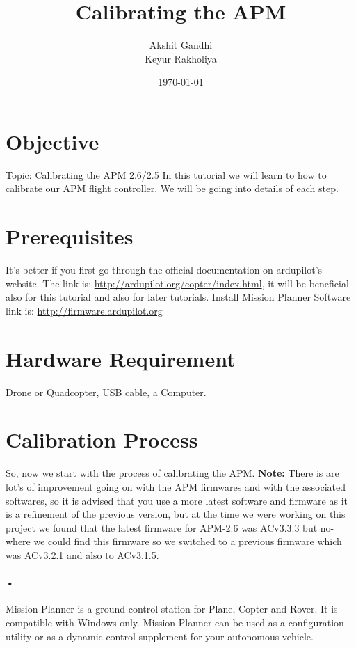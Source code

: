 \documentclass[11pt,a4paper]{article}
\title{Calibrating the APM}
\author{Akshit Gandhi \\ Keyur Rakholiya}
\date{\today}
\begin{document}
	\maketitle
	\newpage
	\tableofcontents
	\newpage
	\section{Objective}
	Topic: Calibrating the APM 2.6/2.5
		In this tutorial we will learn to how to calibrate our APM flight controller. We will be going into details of each step.
	\section{Prerequisites}
	 It's better if you first go through the official documentation on ardupilot's website. The link is: \url{http://ardupilot.org/copter/index.html}, it will be beneficial also for this tutorial and also for later tutorials. Install Mission Planner Software link is: \url{http://firmware.ardupilot.org}
	\section{Hardware Requirement}
	 Drone or Quadcopter, USB cable, a Computer.
	\section{Calibration Process}
	 So, now we start with the process of calibrating the APM. \textbf{Note:} There is are lot's of improvement going on with the APM firmwares and with the associated softwares, so it is advised that you use a more latest software and firmware as it is a refinement of the previous version, but at the time we were working on this project we found that the latest firmware for APM-2.6 was ACv3.3.3 but no-where we could find this firmware so we switched to a previous firmware which was ACv3.2.1 and also to ACv3.1.5.
	 \paragraph{•}Mission Planner is a ground control station for Plane, Copter and Rover. It is compatible with Windows only. Mission Planner can be used as a configuration utility or as a dynamic control supplement for your autonomous vehicle.
\end{document}
